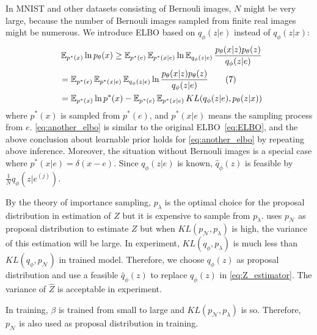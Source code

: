 In MNIST and other datasets consisting of Bernouli images, $N$ might be very large, because the number of Bernouli images sampled from finite real images might be numerous. We introduce ELBO based on $q_\phi(z|e)$ instead of $q_\phi(z|x)$:
\begin{align*}~\label{eq:another_elbo}
	&\operatorname{\mathbb{E}}_{p^*(x)} \ln p_\theta(x) \geq \operatorname{\mathbb{E}}_{p^*(e)} \operatorname{\mathbb{E}}_{p^*(x|e)} \ln \operatorname{\mathbb{E}}_{q_\phi(z|e)} \frac{p_\theta(x|z)p_\theta(z)}{q_\phi(z|e)} \\
	 &= \operatorname{\mathbb{E}}_{p^*(e)} \operatorname{\mathbb{E}}_{p^*(x|e)} \operatorname{\mathbb{E}}_{q_\phi(z|e)} \ln \frac{p_\theta(x|z)p_\theta(z)}{q_\phi(z|e)} \tag{7} \\
	 &= \operatorname{\mathbb{E}}_{p^*(x)} \ln p^*(x) - \operatorname{\mathbb{E}}_{p^*(e)} \operatorname{\mathbb{E}}_{p^*(x|e)} KL(q_\phi(z|e), p_\theta(z|x))
\end{align*} 
where $p^*(x)$ is sampled from $p^*(e)$, and $p^*(x|e)$ means the sampling process from $e$. \cref{eq:another_elbo} is similar to the original ELBO~\cref{eq:ELBO}, and the above conclusion about learnable prior holds for \cref{eq:another_elbo} by repeating above inference. Moreover, the situation without Bernouli images is a special case where $p^*(x|e) = \delta(x - e)$. %
Since $q_\phi(z|e)$ is known, $\hat{q}_\phi(z)$ is feasible by $\frac{1}{N} q_\phi(z|e^{(j)})$. 

By the theory of importance sampling, $p_\lambda$ is the optimal choice for the proposal distribution in estimation of $Z$ but it is expensive to sample from $p_\lambda$. 
\cite{bauer2019resampled} uses $p_\mathcal{N}$ as proposal distribution to estimate $Z$ but when $KL(p_\mathcal{N}, p_\lambda)$ is high, the variance of this estimation will be large. In experiment, $KL(q_\phi, p_\lambda)$ is much less than $KL(q_\phi, p_\mathcal{N})$ in trained model. Therefore, we choose $q_\phi(z)$ as proposal distribution and use a feasible $\hat{q}_\phi(z)$ to replace $q_\phi(z)$ in \cref{eq:Z_estimator}. The variance of $\hat{Z}$ is acceptable in experiment.  

In training, $\beta$ is trained from small to large and $KL(p_\mathcal{N}, p_\lambda)$ is so. Therefore, $p_\mathcal{N}$ is also used as proposal distribution in training. 